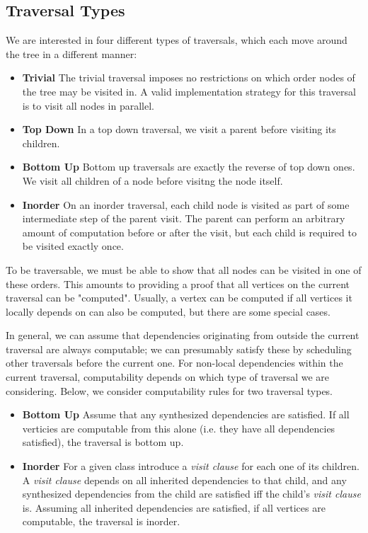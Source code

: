 \documentclass[10pt]{article}
\begin{document}
\subsection{Traversal Types}
We are interested in four different types of traversals, which each move around the tree in a different manner:
\begin{itemize}
    \item \textbf{Trivial} The trivial traversal imposes no restrictions on which order nodes of the tree may be visited in. A valid implementation strategy for this traversal is to visit all nodes in parallel.
    \item \textbf{Top Down} In a top down traversal, we visit a parent before visiting its children. 
    \item \textbf{Bottom Up} Bottom up traversals are exactly the reverse of top down ones. We visit all children of a node before visitng the node itself.
    \item \textbf{Inorder} On an inorder traversal, each child node is visited as part of some intermediate step of the parent visit. The parent can perform an arbitrary amount of computation before or after the visit, but each child is required to be visited exactly once.
\end{itemize}

To be traversable, we must be able to show that all nodes can be visited in one of these orders. This amounts to providing a proof that all vertices on the current traversal can be "computed". Usually, a vertex can be computed if all vertices it locally depends on can also be computed, but there are some special cases.

In general, we can assume that dependencies originating from outside the current traversal are always computable; we can presumably satisfy these by scheduling other traversals before the current one. For non-local dependencies within the current traversal, computability depends on which type of traversal we are considering. Below, we consider computability rules for two traversal types.

\begin{itemize}
    \item \textbf{Bottom Up} Assume that any synthesized dependencies are satisfied. If all verticies are computable from this alone (i.e. they have all dependencies satisfied), the traversal is bottom up.
    \item \textbf{Inorder} For a given class introduce a \emph{visit clause} for each one of its children. A \emph{visit clause} depends on all inherited dependencies to that child, and any synthesized dependencies from the child are satisfied iff the child's \emph{visit clause} is. Assuming all inherited dependencies are satisfied, if all vertices are computable, the traversal is inorder.
\end{itemize}
\end{document}
